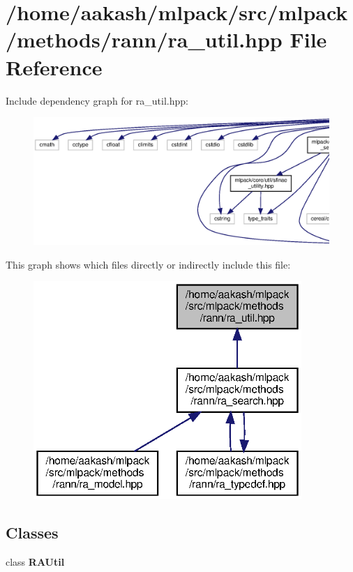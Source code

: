 \section{/home/aakash/mlpack/src/mlpack/methods/rann/ra\+\_\+util.hpp File Reference}
\label{ra__util_8hpp}
Include dependency graph for ra\+\_\+util.\+hpp\+:
\nopagebreak
\begin{figure}[H]
\begin{center}
\leavevmode
\includegraphics[width=350pt]{ra__util_8hpp__incl}
\end{center}
\end{figure}
This graph shows which files directly or indirectly include this file\+:
\nopagebreak
\begin{figure}[H]
\begin{center}
\leavevmode
\includegraphics[width=288pt]{ra__util_8hpp__dep__incl}
\end{center}
\end{figure}
\subsection*{Classes}
\begin{DoxyCompactItemize}
\item 
class \textbf{ R\+A\+Util}
\end{DoxyCompactItemize}
